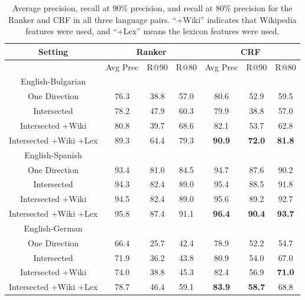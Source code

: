 \begin{table}[ht]
\small
\begin{center}
\begin{tabular}{|c||c|c|c||c|c|c|}
\hline
Setting           & \multicolumn{3}{|c||}{Ranker} & \multicolumn{3}{|c|}{CRF} \\
\hline
                  & Avg Prec & R@90 & R@80
                  & Avg Prec & R@90 & R@80\\
\hline
English-Bulgarian & & & & & & \\
\hline
One Direction          & 76.3  & 38.8  & 57.0    & 80.6  & 52.9  & 59.5 \\
Intersected            & 78.2  & 47.9  & 60.3    & 79.9  & 38.8  & 57.0 \\
Intersected +Wiki      & 80.8  & 39.7  & 68.6    & 82.1  & 53.7  & 62.8 \\
Intersected +Wiki +Lex & 89.3  & 64.4  & 79.3    & {\bf 90.9}  & {\bf 72.0}  & {\bf 81.8} \\
\hline
English-Spanish & & & & & & \\
\hline
One Direction          & 93.4  & 81.0  & 84.5    & 94.7  & 87.6  & 90.2 \\
Intersected            & 94.3  & 82.4  & 89.0    & 95.4  & 88.5  & 91.8 \\
Intersected +Wiki      & 94.5  & 82.4  & 89.0    & 95.6  & 89.2  & 92.7 \\
Intersected +Wiki +Lex & 95.8  & 87.4  & 91.1    & {\bf 96.4}  & {\bf 90.4}  & {\bf 93.7} \\
\hline
English-German & & & & & & \\
\hline
One Direction          & 66.4  & 25.7  & 42.4    & 78.9  & 52.2  & 54.7 \\
Intersected            & 71.9  & 36.2  & 43.8    & 80.9  & 54.0  & 67.0 \\
Intersected +Wiki      & 74.0  & 38.8  & 45.3    & 82.4  & 56.9  & {\bf 71.0} \\
Intersected +Wiki +Lex & 78.7  & 46.4  & 59.1    & {\bf 83.9}  & {\bf 58.7}  & 68.8 \\
\hline
\end{tabular}
\end{center}
\caption{Average precision, recall at 90\% precision, and recall at 80\%
precision for the Ranker and CRF in all three language pairs.  ``+Wiki''
indicates that Wikipedia features were used, and ``+Lex'' means the lexicon
features were used.}
\label{table:featurecompare}
\end{table}


